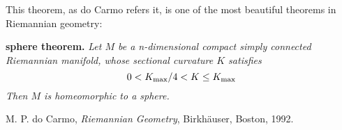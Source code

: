 \documentclass[12pt]{article}
\begin{document}
This theorem, as do Carmo refers it, is one of the most beautiful theorems in Riemannian geometry:

{\bf sphere theorem.} {\it Let $M$ be a n-dimensional compact simply connected Riemannian manifold, whose sectional curvature $K$ satisfies
$$0<K_{\rm max}/4<K\le K_{\rm max}$$
Then $M$ is homeomorphic to a sphere.}

\begin{thebibliography}{9}
 M. P. do Carmo, {\em Riemannian Geometry}, Birkh\"auser, Boston, 1992.
\end{thebibliography}




\end{document}
